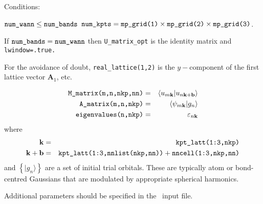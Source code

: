 Conditions:
\begin{itemize}
\cond $\verb#num_wann# \le \verb#num_bands#$
\cond $\verb#num_kpts# = \verb#mp_grid(1)# \times \verb#mp_grid(2)#
\times \verb#mp_grid(3)#$.
\end{itemize}

If $\verb#num_bands# = \verb#num_wann#$ then \verb#U_matrix_opt# is the identity matrix and
\verb#lwindow=.true.#

For the avoidance of doubt, \verb#real_lattice(1,2)# is the
$y-$component of the first lattice 
vector $\mathbf{A}_{1}$, etc.

\begin{eqnarray*}
\verb#M_matrix(m,n,nkp,nn)# & = & \left\langle u_{m\mathbf{k}} |
u_{n\mathbf{k+b}}\right\rangle\\
\verb#A_matrix(m,n,nkp)# & = &
\left\langle \psi_{m\mathbf{k}}|g_{n}\right\rangle\\
\verb#eigenvalues(n,nkp)# &=& \varepsilon_{n\mathbf{k}}
\end{eqnarray*}
where
\begin{eqnarray*}
\mathbf{k} &=&\verb#kpt_latt(1:3,nkp)#\\
\mathbf{k+b}&=& \verb#kpt_latt(1:3,nnlist(nkp,nn))# +
\verb#nncell(1:3,nkp,nn)# 
\end{eqnarray*}
and
$\left\{|g_{n}\rangle\right\}$ are a set of initial trial
orbitals. These are
typically atom or bond-centred Gaussians that are modulated by
appropriate spherical harmonics. 

Additional parameters should be specified in the \wannier\ input
file.

